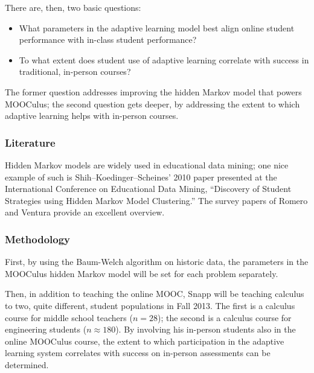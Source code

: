 \documentclass[12pt]{article}
\begin{document}
There are, then, two basic questions:
\begin{itemize}
\item What parameters in the adaptive
  learning model best align online student performance with in-class
  student performance?
\item To what extent does student use
  of adaptive learning correlate with success in traditional,
  in-person courses?
\end{itemize}
The former question addresses improving the hidden Markov model that
powers MOOCulus; the second question gets deeper, by addressing the
extent to which adaptive learning helps with in-person courses.

\subsubsection*{Literature}

Hidden Markov models are widely used in educational data mining; one
nice example of such is Shih--Koedinger--Scheines' 2010 paper
presented at the International Conference on Educational Data Mining,
``Discovery of Student Strategies using Hidden Markov Model
Clustering.''  The survey papers of Romero and Ventura provide an
excellent overview.

\subsubsection*{Methodology}

First, by using the Baum-Welch algorithm on historic data, the
parameters in the MOOCulus hidden Markov model will be set for each
problem separately.

Then, in addition to teaching the online MOOC, Snapp will be teaching
calculus to two, quite different, student populations in Fall 2013.
The first is a calculus course for middle school teachers ($n=28$);
the second is a calculus course for engineering students ($n\approx
180$).  By involving his in-person students also in the online
MOOCulus course, the extent to which participation in the adaptive
learning system correlates with success on in-person assessments can
be determined.
\end{document}

